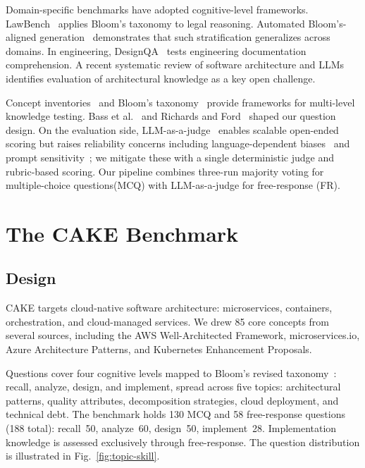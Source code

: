 \documentclass[conference]{IEEEtran}
\begin{document}
Domain-specific benchmarks have adopted cognitive-level frameworks. LawBench~\cite{b21} applies Bloom's taxonomy to legal reasoning. Automated Bloom's-aligned generation~\cite{b22} demonstrates that such stratification generalizes across domains. In engineering, DesignQA~\cite{b23} tests engineering documentation comprehension. A recent systematic review of software architecture and LLMs~\cite{b24} identifies evaluation of architectural knowledge as a key open challenge.

Concept inventories~\cite{b11} and Bloom's taxonomy~\cite{b14,b15} provide frameworks for multi-level knowledge testing. Bass et al.~\cite{b9} and Richards and Ford~\cite{b10} shaped our question design. On the evaluation side, LLM-as-a-judge~\cite{b8} enables scalable open-ended scoring but raises reliability concerns including language-dependent biases~\cite{b26} and prompt sensitivity~\cite{b20}; we mitigate these with a single deterministic judge and rubric-based scoring. Our pipeline combines three-run majority voting for multiple-choice questions(MCQ) with LLM-as-a-judge for free-response (FR).

\section{The CAKE Benchmark}
\label{sec:benchmark}
\subsection{Design}

CAKE targets cloud-native software architecture: microservices, containers, orchestration, and cloud-managed services. We drew 85 core concepts from several sources, including the AWS Well-Architected Framework, microservices.io, Azure Architecture Patterns, and Kubernetes Enhancement Proposals.

Questions cover four cognitive levels mapped to Bloom's revised taxonomy~\cite{b13}: recall, analyze, design, and implement, spread across five topics: architectural patterns, quality attributes, decomposition strategies, cloud deployment, and technical debt. The benchmark holds 130 MCQ and 58 free-response questions (188 total): recall~50, analyze~60, design~50, implement~28. Implementation knowledge is assessed exclusively through free-response. The question distribution is illustrated in Fig.~\ref{fig:topic-skill}.
\end{document}
